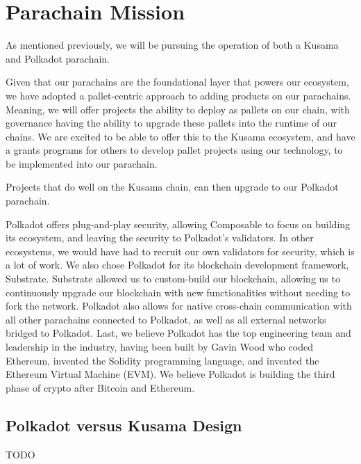 \section{Parachain Mission}

As mentioned previously, we will be pursuing the operation of both a Kusama and Polkadot parachain.

Given that our parachains are the foundational layer that powers our ecosystem, we have adopted a pallet-centric approach to adding products on our parachains. Meaning, we will offer projects the ability to deploy as pallets on our chain, with governance having the ability to upgrade these pallets into the runtime of our chains. We are excited to be able to offer this to the Kusama ecosystem, and have a grants programs for others to develop pallet projects using our technology, to be implemented into our parachain.

Projects that do well on the Kusama chain, can then upgrade to our Polkadot parachain.

Polkadot offers plug-and-play security, allowing Composable to focus on building its ecosystem, and leaving the security to Polkadot’s validators.
%
In other ecosystems, we would have had to recruit our own validators for security, which is a lot of work. We also chose Polkadot for its blockchain development framework, Substrate. Substrate allowed us to custom-build our blockchain, allowing us to continuously upgrade our blockchain with new functionalities without needing to fork the network.
%
Polkadot also allows for native cross-chain communication with all other parachains connected to Polkadot, as well as all external networks bridged to Polkadot.
%
Last, we believe Polkadot has the top engineering team and leadership in the industry, having been built by Gavin Wood who coded Ethereum, invented the Solidity programming language, and invented the Ethereum Virtual Machine (EVM). We believe Polkadot is building the third phase of crypto after Bitcoin and Ethereum.

\subsection{Polkadot versus Kusama Design}
TODO

